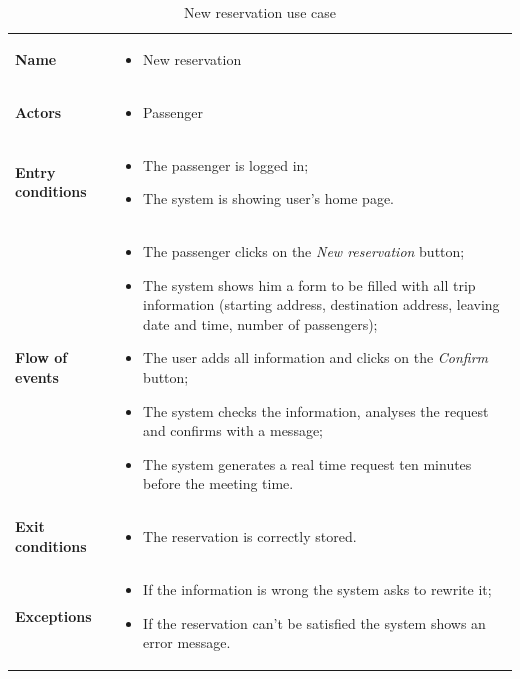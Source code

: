 \begin{table}
\begin{center}
\begin{tabular}{lp{}}
\toprule
\textbf{Name}		&	\begin{itemize}
					\item New reservation
					\end{itemize}	\\
\textbf{Actors}		&	\begin{itemize}
					\item Passenger
					\end{itemize}	\\
\textbf{Entry conditions}	&	\begin{itemize}
					\item	The passenger is logged in;
					\item	The system is showing user's home page.
					\end{itemize}	\\
\textbf{Flow of events}	&	\begin{itemize}
					\item	The passenger clicks on the \emph{New reservation} button;
					\item	The system shows him a form to be filled with all trip information (starting address, destination address, leaving date and time, number of passengers);
					\item	The user adds all information and clicks on the \emph{Confirm} button;
					\item	The system checks the information, analyses the request and confirms with a message;
					\item	The system generates a real time request ten minutes before the meeting time.
					\end{itemize}	\\
\textbf{Exit conditions}	&	\begin{itemize}
					\item	The reservation is correctly stored.
					\end{itemize}	\\
\textbf{Exceptions}	&	\begin{itemize}
					\item	If the information is wrong the system asks to rewrite it;
					\item	If the reservation can't be satisfied the system shows an error message.
					\end{itemize}	\\
\bottomrule
\end{tabular}
\caption{New reservation use case}
\end{center}	
\end{table}

